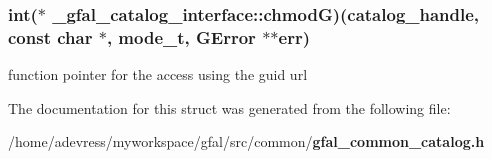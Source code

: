 \subsubsection{\setlength{\rightskip}{0pt plus 5cm}int($\ast$ \bf{\_\-gfal\_\-catalog\_\-interface::chmod\-G})(catalog\_\-handle, const char $\ast$, mode\_\-t, GError $\ast$$\ast$err)}\label{struct__gfal__catalog__interface_a2d423528930c419615115f14911238e}


function pointer for the access using the guid url 

The documentation for this struct was generated from the following file:\begin{CompactItemize}
\item 
/home/adevress/myworkspace/gfal/src/common/\bf{gfal\_\-common\_\-catalog.h}\end{CompactItemize}
